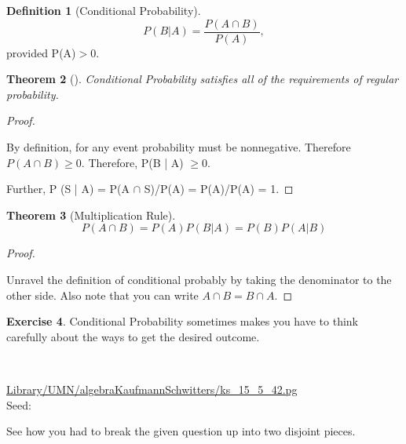 \documentclass[10pt,]{book}
\theoremstyle{plain}
\newtheorem{theorem}{Theorem}[section]
\theoremstyle{definition}
\newtheorem{definition}[theorem]{Definition}
\theoremstyle{definition}
\theoremstyle{definition}
\newtheorem{exercise}[theorem]{Exercise}
\numberwithin{equation}{section}
\newcommand{\gt}{ > }
\begin{document}
\begin{definition}[{Conditional Probability}]\label{definition-22}
\begin{equation*}P(B | A) = \frac{P(A \cap B)}{ P(A) },\end{equation*}
			 provided P(A)\(\gt 0\).\end{definition}
\begin{theorem}[{}]\label{theorem-18}
Conditional Probability satisfies all of the requirements of regular probability.\end{theorem}
\begin{proof}\hypertarget{proof-17}{}

		By definition, for any event probability must be nonnegative. Therefore
		\(P(A \cap B) \ge 0\).  Therefore, P(B | A) \(\ge 0\).
\par

		Further, P (S | A) = P(A \(\cap\) S)/P(A) = P(A)/P(A) = 1.
\end{proof}
\begin{theorem}[{Multiplication Rule}]\label{theorem-19}
\begin{equation*}P(A \cap B) = P(A) P(B | A) = P(B) P(A | B)\end{equation*}\end{theorem}
\begin{proof}\hypertarget{proof-18}{}

		Unravel the definition of conditional probably by taking the denominator to the other side. Also note that you can write \(A \cap B = B \cap A\).
\end{proof}
\begin{exercise}\label{exercise-22}
Conditional Probability sometimes makes you have to think carefully about the ways to get 
		the desired outcome.
\par\medskip
\mbox{}\\ %
\begin{mdframed}
{}\par\vspace*{2ex}%
{\tiny\ttfamily\noindent\url{Library/UMN/algebraKaufmannSchwitters/ks_15_5_42.pg}\\Seed: \hfill}\end{mdframed}
\medskip\noindent 
		See how you had to break the given question up into two disjoint pieces.
\par
\end{exercise}
\typeout{************************************************}
\typeout{************************************************}
\end{document}
